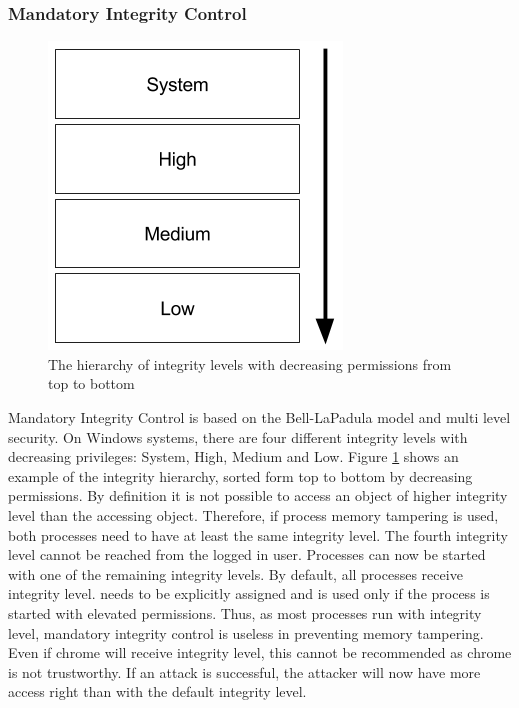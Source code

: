 \subsubsection{Mandatory Integrity Control}
\begin{figure}[h]
\centering
\includegraphics[scale=0.5]{sections/background/defenses/mic.png}
\caption{The hierarchy of integrity levels with decreasing permissions from top to bottom}
\label{fig:mic}
\end{figure}
Mandatory Integrity Control is based on the Bell-LaPadula \cite{eckert2014sicherheit} model and multi level security. On Windows systems, there are four different integrity levels with decreasing privileges: System, High, Medium and Low. Figure \ref{fig:mic} shows an example of the integrity hierarchy, sorted form top to bottom by decreasing permissions. By definition it is not possible to access an object of higher integrity level than the accessing object. Therefore, if process memory tampering is used, both processes need to have at least the same integrity level. The fourth integrity level  cannot be reached from the logged in user. Processes can now be started with one of the remaining integrity levels. By default, all processes receive  integrity level.  needs to be explicitly assigned and  is used only if the process is started with elevated permissions. Thus, as most processes run with  integrity level, mandatory integrity control is useless in preventing memory tampering. Even if chrome will receive  integrity level, this cannot be recommended as chrome is not trustworthy. If an attack is successful, the attacker will now have more access right than with the default  integrity level.